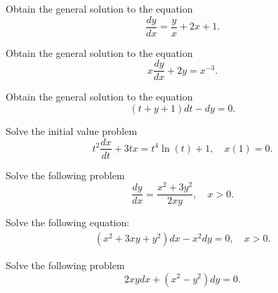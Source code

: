 \documentclass[11pt]{article}
\begin{document}
\begin{problem}
Obtain the general solution to the equation
\begin{equation*}
      \dfrac{ dy }{dx} = \frac{y }{x} + 2 x + 1.
\end{equation*}
\end{problem}


\begin{problem}
Obtain the general solution to the equation
\begin{equation*}
      x \dfrac{ dy }{dx}+ 2 y = x^{-3}.
\end{equation*}
\end{problem}


\begin{problem}
Obtain the general solution to the equation
\begin{equation*}
     (t+y+1)dt -  dy =0 .
\end{equation*}
\end{problem}

\begin{problem}
Solve the initial value problem
\begin{equation*}
     t^2 \dfrac{ dx }{dt} + 3 t x = t^4 \ln(t) +1 , \quad x(1) =0. 
\end{equation*}
\end{problem}


\begin{problem}
Solve the following problem
\begin{equation*}
\frac{dy}{dx}=\frac{x^{2}+3y^{2}}{2xy}, \quad x>0. 
\end{equation*}
\end{problem}


\begin{problem}
  Solve the following equation:
  \begin{equation*}
    \begin{aligned}
      \left( x^2 + 3x y + y^2 \right)dx - x^2 dy = 0, \quad x>0.
    \end{aligned}
  \end{equation*}
\end{problem}



\begin{problem}
Solve the following problem
\begin{equation*}
2xy dx+(x^{2}-y^{2})dy=0. 
\end{equation*}
\end{problem}
\end{document}
